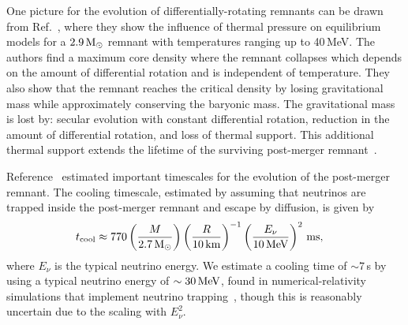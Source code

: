 \documentclass[../Thesis.tex]{subfiles}
\begin{document}
    One picture for the evolution of differentially-rotating remnants can be drawn from Ref.~\cite{Kaplan2014}, where they show the influence of thermal pressure on equilibrium models for a $2.9\,\mathrm{M}_{\odot}$ remnant with temperatures ranging up to 40\,MeV.
    The authors find a maximum core density where the remnant collapses which depends on the amount of differential rotation and is independent of temperature.
    They also show that the remnant reaches the critical density by losing gravitational mass while approximately conserving the baryonic mass.
    The gravitational mass is lost by: secular evolution with constant differential rotation, reduction in the amount of differential rotation, and loss of thermal support.
    This additional thermal support extends the lifetime of the surviving post-merger remnant~\cite[e.g.,][]{Bauswein2010}.
 \par
    
    Reference~\cite{Paschalidis2012} estimated important timescales for the evolution of the post-merger remnant.
    The cooling timescale, estimated by assuming that neutrinos are trapped inside the post-merger remnant and escape by diffusion, is given by
    \begin{align}
        t_{\mathrm{cool}} & \approx 770 \left(\frac{M}{2.7\,\mathrm{M}_{\odot}}\right)\left(\frac{R}{10\,\mathrm{km}}\right)^{-1}\left(\frac{E_\nu}{10\,\mathrm{MeV}}\right)^2\,\mathrm{ms}, \label{eq:Intro:NeutrinoCooling}        
    \end{align}    
    where $E_\nu$ is the typical neutrino energy.
    We estimate a cooling time of $\sim 7$\,s by using a typical neutrino energy of $\sim 30\,\mathrm{MeV}$, found in numerical-relativity simulations that implement neutrino trapping~\cite{Sumiyoshi2020}, though this is reasonably uncertain due to the scaling with $E_\nu^2$.\par
    
\end{document}
